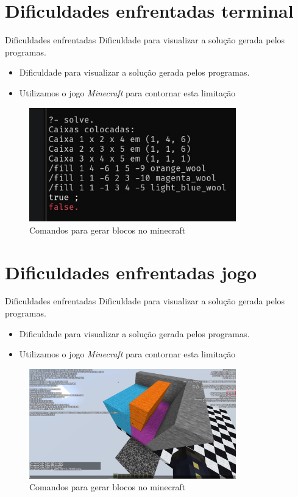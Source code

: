 \documentclass{beamer}
\begin{document}
\section{Dificuldades enfrentadas terminal}
\begin{frame}{Dificuldades enfrentadas}
	Dificuldade para visualizar a solução gerada pelos programas.
	\begin{itemize}
		\item Dificuldade para visualizar a solução gerada pelos programas.
		\item Utilizamos o jogo \textit{Minecraft} para contornar esta limitação
	\end{itemize}

	\begin{figure}
		\centering
		\includegraphics[width=0.8\textwidth]{minecraft-terminal.jpg}
		\caption{Comandos para gerar blocos no minecraft}
	\end{figure}
\end{frame}

\section{Dificuldades enfrentadas jogo}
\begin{frame}{Dificuldades enfrentadas}
	Dificuldade para visualizar a solução gerada pelos programas.
	\begin{itemize}
		\item Dificuldade para visualizar a solução gerada pelos programas.
		\item Utilizamos o jogo \textit{Minecraft} para contornar esta limitação
	\end{itemize}

	\begin{figure}
		\centering
		\includegraphics[width=0.8\textwidth]{minecraft-jogo.jpg}
		\caption{Comandos para gerar blocos no minecraft}
	\end{figure}
\end{frame}
\end{document}
